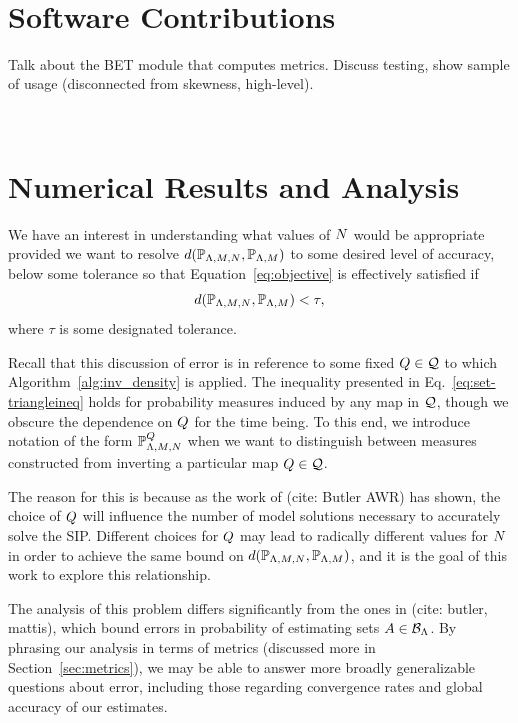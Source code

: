 \
\section{Software Contributions}\label{sec:ch03-software}

Talk about the BET module that computes metrics.
Discuss testing, show sample of usage (disconnected from skewness, high-level).


\
\section{Numerical Results and Analysis}\label{sec:ch03-examples}


We have an interest in understanding what values of $N$ would be appropriate provided we want to resolve $d(\mathbb{P}_{{\Lambda}, M, N}, \mathbb{P}_{{\Lambda}, M})$ to some desired level of accuracy, below some tolerance so that Equation~\eqref{eq:objective} is effectively satisfied if
\begin{equation}\label{eq:newobjective}
d(\mathbb{P}_{{\Lambda}, M, N}, \mathbb{P}_{{\Lambda},M}) < \tau,
\end{equation}
where $\tau$ is some designated tolerance.

Recall that this discussion of error is in reference to some fixed $Q\in\mathcal{Q}$ to which Algorithm~\ref{alg:inv_density} is applied.
The inequality presented in Eq.~\eqref{eq:set-triangleineq} holds for probability measures induced by any map in $\mathcal{Q}$, though we obscure the dependence on $Q$ for the time being.
To this end, we introduce notation of the form $\mathbb{P}_{{\Lambda}, M, N}^{Q}$ when we want to distinguish between measures constructed from inverting a particular map $Q\in\mathcal{Q}$.

The reason for this is because as the work of (cite: Butler AWR) has shown, the choice of $Q$ will influence the number of model solutions necessary to accurately solve the SIP.
Different choices for $Q$ may lead to radically different values for $N$ in order to achieve the same bound on $d(\mathbb{P}_{{\Lambda}, M, N}, \mathbb{P}_{{\Lambda}, M})$, and it is the goal of this work to explore this relationship.

The analysis of this problem differs significantly from the ones in (cite: butler, mattis), which bound errors in probability of estimating sets $A\in\mathcal{B}_{{\Lambda}}$.
By phrasing our analysis in terms of metrics (discussed more in Section~\ref{sec:metrics}), we may be able to answer more broadly generalizable questions about error, including those regarding convergence rates and global accuracy of our estimates.



\FloatBarrier


\FloatBarrier
